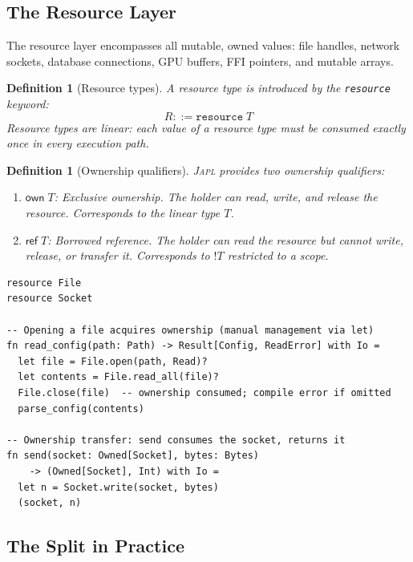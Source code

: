 \documentclass[11pt]{article}
\newtheorem{definition}[theorem]{Definition}
\newcommand{\JAPL}{\textsc{Japl}}
\newcommand{\own}{\mathsf{own}}
\newcommand{\rref}{\mathsf{ref}}
\newcommand{\bang}{{\mathop{!}}}
\begin{document}
\subsection{The Resource Layer}\label{sec:resource-layer}

The resource layer encompasses all mutable, owned values: file handles,
network sockets, database connections, GPU buffers, FFI pointers, and
mutable arrays.

\begin{definition}[Resource types]\label{def:resource-types}
A resource type is introduced by the \texttt{resource} keyword:
\[
  R ::= \texttt{resource}\; T
\]
Resource types are \emph{linear}: each value of a resource type must
be consumed exactly once in every execution path.
\end{definition}

\begin{definition}[Ownership qualifiers]\label{def:ownership-qualifiers}
\JAPL{} provides two ownership qualifiers:
\begin{enumerate}[label=(\alph*)]
  \item $\own\; T$: Exclusive ownership.  The holder can read, write,
        and release the resource.  Corresponds to the linear type $T$.
  \item $\rref\; T$: Borrowed reference.  The holder can read the
        resource but cannot write, release, or transfer it.
        Corresponds to $\bang T$ restricted to a scope.
\end{enumerate}
\end{definition}

\begin{lstlisting}[caption={Resource-layer code: explicit ownership},label={lst:resource-layer}]
resource File
resource Socket

-- Opening a file acquires ownership (manual management via let)
fn read_config(path: Path) -> Result[Config, ReadError] with Io =
  let file = File.open(path, Read)?
  let contents = File.read_all(file)?
  File.close(file)  -- ownership consumed; compile error if omitted
  parse_config(contents)

-- Ownership transfer: send consumes the socket, returns it
fn send(socket: Owned[Socket], bytes: Bytes)
    -> (Owned[Socket], Int) with Io =
  let n = Socket.write(socket, bytes)
  (socket, n)
\end{lstlisting}

\subsection{The Split in Practice}
\end{document}
